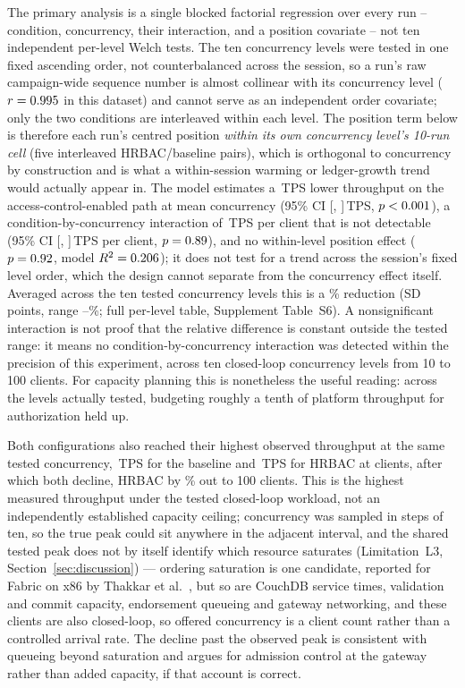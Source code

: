 \documentclass[a4paper,fleqn]{cas-sc}
\begin{document}
The primary analysis is a single blocked factorial regression over every
run -- condition, concurrency, their interaction, and a position
covariate -- not ten independent per-level Welch tests. The ten
concurrency levels were tested in one fixed ascending order, not
counterbalanced across the session, so a run's raw campaign-wide sequence
number is almost collinear with its concurrency level
($r=0.995$ in this dataset) and cannot serve as an
independent order covariate; only the two conditions are interleaved
within each level. The position term below is therefore each run's
centred position \emph{within its own concurrency level's 10-run cell}
(five interleaved HRBAC/baseline pairs), which is orthogonal to
concurrency by construction and is what a within-session warming or
ledger-growth trend would actually appear in. The model estimates a
\ThrCondCoef\,TPS lower throughput on the access-control-enabled path at
mean concurrency (95\% CI [\ThrCondCoefCILow, \ThrCondCoefCIHigh]\,TPS,
$p<0.001$), a condition-by-concurrency interaction of
\ThrInteractCoef\,TPS per client that is not detectable (95\% CI
[\ThrInteractCILow, \ThrInteractCIHigh]\,TPS per client,
$p=0.89$), and no within-level position effect
($p=0.92$, model $R^2=0.206$); it does not test for a
trend across the session's fixed level order, which the design cannot
separate from the concurrency effect itself. Averaged across the ten
tested concurrency
levels this is a \OverheadMeanPct\% reduction (SD \OverheadSDPct{} points,
range \OverheadMinPct--\OverheadMaxPct\%; full per-level table,
Supplement Table~S6). A nonsignificant interaction is not proof that the
relative difference is constant outside the tested range: it means no
condition-by-concurrency interaction was detected within the precision of
this experiment, across ten closed-loop concurrency levels from 10 to 100
clients. For capacity planning this is nonetheless the useful reading:
across the levels actually tested, budgeting roughly a tenth of platform
throughput for authorization held up.

Both configurations also reached their highest observed throughput at the
same tested concurrency, \PeakBaselineTPS\,TPS for the baseline and
\PeakHrbacTPS\,TPS for HRBAC at \KneeClients{} clients, after which both
decline, HRBAC by \PostKneeDeclinePct\% out to 100 clients. This is the
highest measured throughput under the tested closed-loop workload, not an
independently established capacity ceiling; concurrency was sampled in
steps of ten, so the true peak could sit anywhere in the adjacent
interval, and the shared tested peak does not by itself identify which
resource saturates (Limitation~L3, Section~\ref{sec:discussion}) —
ordering saturation is one candidate, reported for Fabric on x86 by
Thakkar et al.~\cite{thakkar2018performance}, but so are CouchDB service
times, validation and commit capacity, endorsement queueing and gateway
networking, and these clients are also closed-loop, so offered
concurrency is a client count rather than a controlled arrival rate. The
decline past the observed peak is consistent with queueing beyond
saturation and argues for admission control at the gateway rather than
added capacity, if that account is correct.
\end{document}
